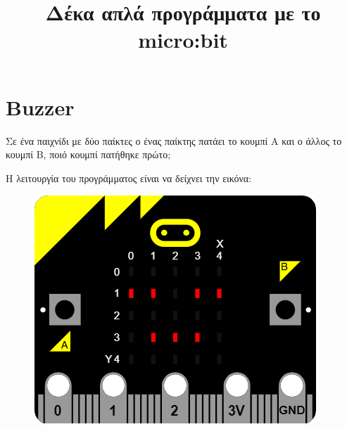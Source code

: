 \documentclass[11pt]{article}
\begin{document}
\setmainfont[Mapping=tex-text,Ligatures=Common]{Arno Pro}
\setsansfont[Mapping=tex-text,Scale=MatchLowercase]{Myriad Pro}
\setmonofont[Mapping=tex-text,Scale=MatchLowercase]{Cascadia Code}

\title{Δέκα απλά προγράμματα με το micro:bit}

\author{}
\date{}
\maketitle
\section{Buzzer}
Σε ένα παιχνίδι με δύο παίκτες ο ένας παίκτης πατάει το κουμπί Α και ο άλλος το κουμπί Β, ποιό κουμπί πατήθηκε πρώτο;

Η λειτουργία του προγράμματος είναι να δείχνει την εικόνα:
\begin{figure}[!h]
\begin{center}
\includegraphics{asleep.png}
\end{center}
\end{figure}
\end{document}
